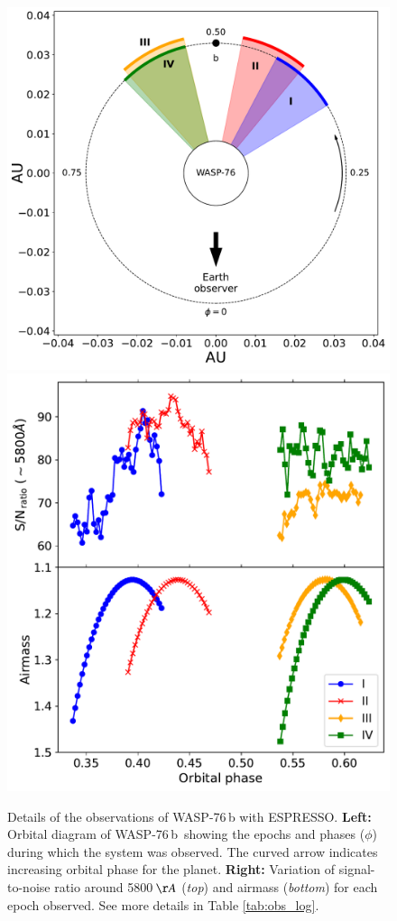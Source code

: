 \documentclass{aa}
\newcommand{\planet}{WASP-76\,b}
\begin{document}
\begin{figure}[h]
    \centering
    \includegraphics[width=0.5\hsize]{plots/orbital_diagram_roman.pdf}
    \includegraphics[width=0.44\hsize]{plots/obs_airmass_SNR_phases2.pdf}
    \caption{Details of the observations of WASP-76\,b with ESPRESSO. \textbf{Left:} Orbital diagram of \planet\ showing the epochs and phases ($\phi$) during which the system was observed. The curved arrow indicates increasing orbital phase for the planet. \textbf{Right:} Variation of signal-to-noise ratio around 5800$\,\AA$ (\textit{top}) and airmass (\textit{bottom}) for each epoch observed. See more details in Table \ref{tab:obs_log}.}
    \label{fig:observations}
\end{figure}
\end{document}
